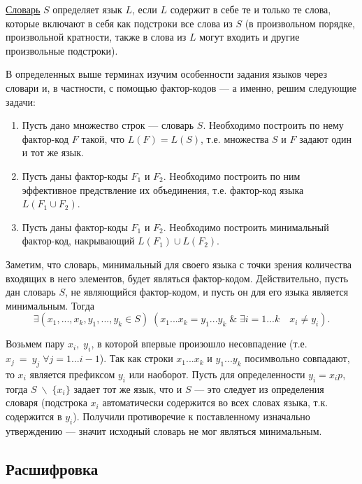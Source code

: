 \documentclass[14pt, russian]{scrartcl}
\begin{document}
\begin{Definition}
\label{Dict}
    \underline{Словарь} $S$ определяет язык $L$, если $L$ содержит в себе те и только те слова, которые включают в себя как подстроки все слова из $S$ (в произвольном порядке, произвольной кратности, также в слова из $L$ могут входить и другие произвольные подстроки). 
\end{Definition}

В определенных выше терминах изучим особенности задания языков через словари и, в частности, с помощью фактор-кодов --- а именно, решим следующие задачи:

\begin{enumerate}
    \item Пусть дано множество строк --- словарь $S$. Необходимо построить по нему фактор-код $F$ такой, что $L(F) = L(S)$, т.е. множества $S$ и $F$ задают один и тот же язык. 
    \item Пусть даны фактор-коды $F_1$ и $F_2$. Необходимо построить по ним эффективное предствление их объединения, т.е. фактор-код языка $L(F_1 \cup F_2 )$.
    \item Пусть даны фактор-коды $F_1$ и $F_2$. Необходимо построить минимальный фактор-код, накрывающий $L(F_1) \cup L(F_2)$. 
\end{enumerate}


Заметим, что словарь, минимальный для своего языка с точки зрения количества входящих в него элементов, будет являться фактор-кодом. Действительно, пусть дан словарь $S$, не являющийся фактор-кодом, и пусть он для его языка является минимальным. Тогда 
$$ \exists (x_1, ..., x_k, y_1, ..., y_k \in S )\; (x_1...x_k = y_1...y_k \; \& \; \exists i = 1...k \quad x_i \neq y_i). $$

Возьмем пару $x_i, \; y_i$, в которой впервые произошло несовпадение (т.е. $x_j~=~y_j \; \forall j = 1...i-1$). Так как строки $x_1...x_k$ и $y_1...y_k$ посимвольно совпадают, то $x_i$ является префиксом $y_i$ или наоборот. Пусть для определенности $y_i = x_i p$, тогда $S \; \backslash \; \{x_i\}$ задает тот же язык, что и $S$ --- это следует из определения словаря (подстрока $x_i$ автоматически содержится во всех словах языка, т.к. содержится в $y_i$). Получили противоречие к поставленному изначально утверждению --- значит исходный словарь не мог являться минимальным.

\subsection{Расшифровка}
\end{document}
